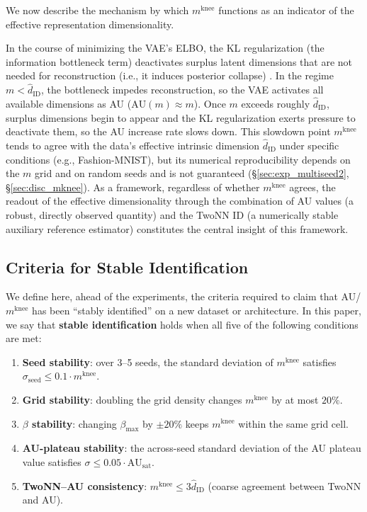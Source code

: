 \documentclass[make,article,submit,pdftex,moreauthors]{Definitions/mdpi}
\newcommand{\AUsat}{\mathrm{AU}_{\mathrm{sat}}}
\newcommand{\mknee}{m^{\mathrm{knee}}}
\begin{document}
We now describe the mechanism by which $\mknee$ functions as an indicator of the
effective representation dimensionality.

In the course of minimizing the VAE's ELBO, the KL regularization (the information
bottleneck term) deactivates surplus latent dimensions that are not needed for
reconstruction (i.e., it induces posterior collapse)
\cite{lucas2019elbo,higgins2017betavae}.
In the regime $m < \hat{d}_\mathrm{ID}$, the bottleneck impedes reconstruction, so the
VAE activates all available dimensions as AU ($\mathrm{AU}(m) \approx m$).
Once $m$ exceeds roughly $\hat{d}_\mathrm{ID}$, surplus dimensions begin to appear and
the KL regularization exerts pressure to deactivate them, so the AU increase rate
slows down.
This slowdown point $\mknee$ tends to agree with the data's effective intrinsic
dimension $\hat{d}_\mathrm{ID}$ under specific conditions (e.g., Fashion-MNIST),
but its numerical reproducibility depends on the $m$ grid and on random seeds
and is not guaranteed (§\ref{sec:exp_multiseed2}, §\ref{sec:disc_mknee}).
As a framework, regardless of whether $\mknee$ agrees, the readout of the
effective dimensionality through the combination of AU values (a robust, directly
observed quantity) and the TwoNN ID (a numerically stable auxiliary reference
estimator) constitutes the central insight of this framework.

\subsection{Criteria for Stable Identification}\label{sec:natimg_stable_id}

We define here, ahead of the experiments, the criteria required to claim that
AU/$\mknee$ has been ``stably identified'' on a new dataset or architecture.
In this paper, we say that \textbf{stable identification} holds when all five of
the following conditions are met:

\begin{enumerate}
  \item \textbf{Seed stability}: over 3--5 seeds, the standard deviation of
        $\mknee$ satisfies $\sigma_\mathrm{seed} \leq 0.1 \cdot \mknee$.
  \item \textbf{Grid stability}: doubling the grid density changes $\mknee$ by
        at most $20\%$.
  \item \textbf{$\beta$ stability}: changing $\beta_{\max}$ by $\pm 20\%$ keeps
        $\mknee$ within the same grid cell.
  \item \textbf{AU-plateau stability}: the across-seed standard deviation of the AU
        plateau value satisfies $\sigma \leq 0.05 \cdot \AUsat$.
  \item \textbf{TwoNN--AU consistency}: $\mknee \leq 3 \hat{d}_\mathrm{ID}$
        (coarse agreement between TwoNN and AU).
\end{enumerate}
\end{document}

